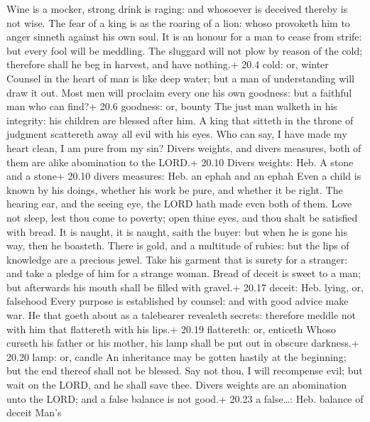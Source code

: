  Wine is a mocker, strong drink is raging: and whosoever is
deceived thereby is not wise.  The fear of a king is as the
roaring of a lion: whoso provoketh him to anger sinneth against his own
soul.  It is an honour for a man to cease from strife: but
every fool will be meddling.  The sluggard will not plow by
reason of the cold; therefore shall he beg in harvest, and have
nothing.+ 20.4 cold: or, winter  Counsel in the heart of man
is like deep water; but a man of understanding will draw it out.
 Most men will proclaim every one his own goodness: but a
faithful man who can find?+ 20.6 goodness: or, bounty  The
just man walketh in his integrity: his children are blessed after him.
 A king that sitteth in the throne of judgment scattereth
away all evil with his eyes.  Who can say, I have made my
heart clean, I am pure from my sin?  Divers weights, and
divers measures, both of them are alike abomination to the LORD.+ 20.10
Divers weights: Heb. A stone and a stone+ 20.10 divers measures: Heb. an
ephah and an ephah  Even a child is known by his doings,
whether his work be pure, and whether it be right.  The
hearing ear, and the seeing eye, the LORD hath made even both of them.
 Love not sleep, lest thou come to poverty; open thine
eyes, and thou shalt be satisfied with bread.  It is
naught, it is naught, saith the buyer: but when he is gone his way, then
he boasteth.  There is gold, and a multitude of rubies: but
the lips of knowledge are a precious jewel.  Take his
garment that is surety for a stranger: and take a pledge of him for a
strange woman.  Bread of deceit is sweet to a man; but
afterwards his mouth shall be filled with gravel.+ 20.17 deceit: Heb.
lying, or, falsehood  Every purpose is established by
counsel: and with good advice make war.  He that goeth
about as a talebearer revealeth secrets: therefore meddle not with him
that flattereth with his lips.+ 20.19 flattereth: or, enticeth
 Whoso curseth his father or his mother, his lamp shall be
put out in obscure darkness.+ 20.20 lamp: or, candle  An
inheritance may be gotten hastily at the beginning; but the end thereof
shall not be blessed.  Say not thou, I will recompense
evil; but wait on the LORD, and he shall save thee.  Divers
weights are an abomination unto the LORD; and a false balance is not
good.+ 20.23 a false\ldots: Heb. balance of deceit  Man's
